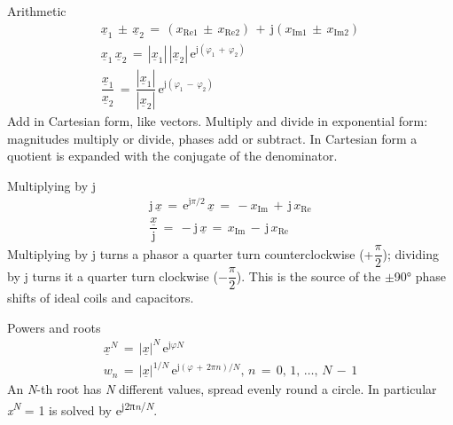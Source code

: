 \documentclass[11pt]{article}
\begin{document}
\begin{keepsection}
\begin{equationcard}{Arithmetic}
\[ \begin{gathered} \underline{{x}}_{1}\, \pm \, \underline{{x}}_{2}\, =\, ({x}_{\text{Re}1}\, \pm \, {x}_{\text{Re}2})\, +\, \mathrm{j}({x}_{\text{Im}1}\, \pm \, {x}_{\text{Im}2}) \\ \underline{{x}}_{1}\, \underline{{x}}_{2}\, =\, |\underline{{x}}_{1}|\, |\underline{{x}}_{2}|\, \mathrm{e}^{\mathrm{j}(φ_{1}\, +\, φ_{2})} \\ \dfrac{\underline{{x}}_{1}}{\underline{{x}}_{2}}\, =\, \dfrac{|\underline{{x}}_{1}|}{|\underline{{x}}_{2}|}\, \mathrm{e}^{\mathrm{j}(φ_{1}\, -\, φ_{2})} \end{gathered} \]
{\small Add in Cartesian form, like vectors. Multiply and divide in exponential form: magnitudes multiply or divide, phases add or subtract. In Cartesian form a quotient is expanded with the conjugate of the denominator.}
\end{equationcard}

\begin{equationcard}{Multiplying by j}
\[ \begin{gathered} \mathrm{j}\, \underline{{x}}\, =\, \mathrm{e}^{\mathrm{j}π/2}\, \underline{{x}}\, =\, -{x}_{\text{Im}}\, +\, \mathrm{j}\, {x}_{\text{Re}} \\ \dfrac{\underline{{x}}}{\mathrm{j}}\, =\, -\mathrm{j}\, \underline{{x}}\, =\, {x}_{\text{Im}}\, -\, \mathrm{j}\, {x}_{\text{Re}} \end{gathered} \]
{\small Multiplying by j turns a phasor a quarter turn counterclockwise (+{\small\ensuremath{\dfrac{π}{2}}}); dividing by j turns it a quarter turn clockwise (\ensuremath{-}{\small\ensuremath{\dfrac{π}{2}}}). This is the source of the \ensuremath{\pm}90° phase shifts of ideal coils and capacitors.}
\end{equationcard}

\begin{equationcard}{Powers and roots}
\[ \begin{gathered} \underline{{x}}^{{N}}\, =\, |\underline{{x}}|^{{N}}\, \mathrm{e}^{\mathrm{j}{φ}{N}} \\ {w}_{{n}}\, =\, |\underline{{x}}|^{1/{N}}\, \mathrm{e}^{\mathrm{j}(φ\, +\, 2π{n})/{N}},\, {n}\, =\, 0,\, 1,\, …,\, {N}\, -\, 1 \end{gathered} \]
{\small An \textit{N}-th root has \textit{N} different values, spread evenly round a circle. In particular \textit{x}\textsuperscript{\textit{N}} = 1 is solved by e\textsuperscript{j2π\textit{n}/\textit{N}}.}
\end{equationcard}


\end{keepsection}
\end{document}

